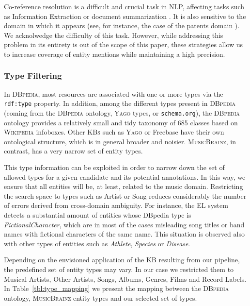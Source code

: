 Co-reference resolution is a difficult and crucial task in NLP, affecting tasks such as Information Extraction \cite{Soon2001} or document summarization \cite{saggion2004multi}. It is also sensitive to the domain in which it appears (see, for instance, the case of the patents domain \cite{Bouayad2014}). We acknolwedge the difficulty of this task. However, while addressing this problem in its entirety is out of the scope of this paper, these strategies allow us to increase coverage of entity mentions while maintaining a high precision.



\subsubsection{Type Filtering}
\label{sec:typefiltering}

In \textsc{DBpedia}, most resources are associated with one or more types via the \texttt{rdf:type} property. In addition, among the different types present in \textsc{DBpedia} (coming from the \textsc{DBpedia} ontology, \textsc{Yago} types, or \texttt{schema.org}), the \textsc{DBpedia} ontology provides a relatively small and tidy taxonomy of 685 classes based on \textsc{Wikipedia} infoboxes. Other \textsc{KBs} such as \textsc{Yago} or Freebase have their own ontological structure, which is in general broader and noisier. \textsc{MusicBrainz}, in contrast, has a very narrow set of entity types. 

This type information can be exploited in order to narrow down the set of allowed types for a given candidate and its potential annotations. In this way, we ensure that all entities will be, at least, related to the music domain. Restricting the search space to types such as Artist or Song reduces considerably the number of errors derived from cross-domain ambiguity. For instance, the EL system detects a substantial amount of entities whose DBpedia type is \textit{FictionalCharacter}, which are in most of the cases misleading song titles or band names with fictional characters of the same name. This situation is observed also with other types of entities such as \textit{Athlete}, \textit{Species} or \textit{Disease}.

Depending on the envisioned application of the \textsc{KB} resulting from our pipeline, the predefined set of entity types may vary. In our case we restricted them to Musical Artists, Other Artists, Songs, Albums, Genres, Films and Record Labels. In Table~\ref{tbl:type_mapping} we present the mapping between the \textsc{DBpedia} ontology, \textsc{MusicBrainz} entity types and our selected set of types.

